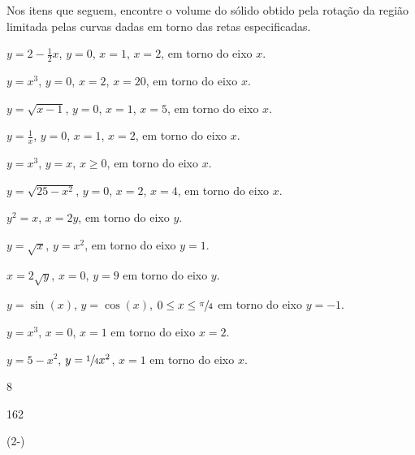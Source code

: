 \begin{exercises}

\begin{exercise} Nos itens que seguem, encontre o volume do sólido obtido
  pela rotação da região limitada pelas curvas dadas em torno das retas
  especificadas.
\begin{alphalist}
  \item $y=2-\frac{1}{2}x$, $y=0$, $x=1$, $x=2$, em torno do eixo $x$.
  \item $y=x^3$, $y=0$, $x=2$, $x=20$, em torno do eixo $x$.
  \item $y=\sqrt{x-1}$, $y=0$, $x=1$, $x=5$, em torno do eixo $x$.
  \item $y=\frac{1}{x}$, $y=0$, $x=1$, $x=2$, em torno do eixo $x$.
  \item $y=x^3$, $y=x$, $x \geq 0$,  em torno do eixo $x$.
  \item $y=\sqrt{25-x^2}$, $y=0$, $x=2$, $x=4$, em torno do eixo $x$.
  \item $y^2=x$, $x=2y$, em torno do eixo $y$.
  \item $y=\sqrt{x}$, $y=x^2$, em torno do eixo $y=1$.
  \item $x=2\sqrt{y}$, $x=0$, $y=9$ em torno do eixo $y$.
  \item $y=\sin(x)$, $y=\cos(x)$, $0\leq x \leq \sfrac{\pi}{4}$
        em torno do eixo $y=-1$.
  \item $y=x^3$, $x=0$, $x=1$ em torno do eixo $x=2$.
  \item $y=5-x^2$, $y=\sfrac{1}{4}x^2$, $x=1$ em torno do eixo $x$.
\end{alphalist}
\begin{answer}
\begin{mathlist}
  \item {}
  \item {}
  \item 8\pi
  \item {}
  \item {}
  \item {}
  \item {}
  \item {}
  \item 162\pi
  \item \left(2-\right)\pi
  \item {}
  \item {}
\end{mathlist}
\end{answer}
\end{exercise}


\end{exercises}
